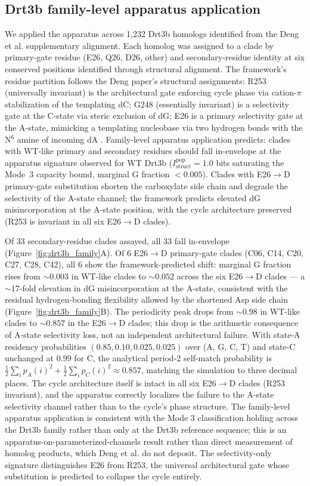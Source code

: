 \documentclass[aps,prx,reprint,amsmath,amssymb,floatfix,superscriptaddress,nofootinbib]{revtex4-2}
\theoremstyle{plain-thm}
\theoremstyle{definition-thm}
\newcommand{\Istructpop}{I_{\mathrm{struct}}^{\mathrm{pop}}}
\begin{document}
\subsection{Drt3b family-level apparatus application}

We applied the apparatus across 1{,}232 Drt3b homologs identified from the Deng et al. supplementary alignment. Each homolog was assigned to a clade by primary-gate residue (E26, Q26, D26, other) and secondary-residue identity at six conserved positions identified through structural alignment. The framework's residue partition follows the Deng paper's structural assignments: R253 (universally invariant) is the architectural gate enforcing cycle phase via cation-$\pi$ stabilization of the templating dC; G248 (essentially invariant) is a selectivity gate at the C-state via steric exclusion of dG; E26 is a primary selectivity gate at the A-state, mimicking a templating nucleobase via two hydrogen bonds with the N$^6$ amine of incoming dA \citep{Deng2026}. Family-level apparatus application predicts: clades with WT-like primary and secondary residues should fall in-envelope at the apparatus signature observed for WT Drt3b ($\Istructpop = 1.0$ bits saturating the Mode~3 capacity bound, marginal G fraction $< 0.005$). Clades with E26$\to$D primary-gate substitution shorten the carboxylate side chain and degrade the selectivity of the A-state channel; the framework predicts elevated dG misincorporation at the A-state position, with the cycle architecture preserved (R253 is invariant in all six E26$\to$D clades).

Of 33 secondary-residue clades assayed, all 33 fall in-envelope (Figure~\ref{fig:drt3b_family}A). Of 6 E26$\to$D primary-gate clades (C06, C14, C20, C27, C28, C42), all 6 show the framework-predicted shift: marginal G fraction rises from $\sim 0.003$ in WT-like clades to $\sim 0.052$ across the six E26$\to$D clades --- a $\sim 17$-fold elevation in dG misincorporation at the A-state, consistent with the residual hydrogen-bonding flexibility allowed by the shortened Asp side chain (Figure~\ref{fig:drt3b_family}B). The periodicity peak drops from $\sim 0.98$ in WT-like clades to $\sim 0.857$ in the E26$\to$D clades; this drop is the arithmetic consequence of A-state selectivity loss, not an independent architectural failure. With state-A residency probabilities $(0.85, 0.10, 0.025, 0.025)$ over (A, G, C, T) and state-C unchanged at $0.99$ for C, the analytical period-2 self-match probability is $\frac{1}{2}\sum_i p_A(i)^2 + \frac{1}{2}\sum_i p_C(i)^2 \approx 0.857$, matching the simulation to three decimal places. The cycle architecture itself is intact in all six E26$\to$D clades (R253 invariant), and the apparatus correctly localizes the failure to the A-state selectivity channel rather than to the cycle's phase structure. The family-level apparatus application is consistent with the Mode 3 classification holding across the Drt3b family rather than only at the Drt3b reference sequence; this is an apparatus-on-parameterized-channels result rather than direct measurement of homolog products, which Deng et al. do not deposit. The selectivity-only signature distinguishes E26 from R253, the universal architectural gate whose substitution is predicted to collapse the cycle entirely.
\end{document}
